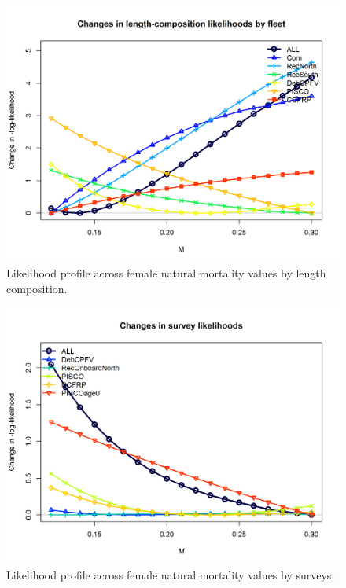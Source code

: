 \documentclass[12pt,]{article}
\begin{document}
\begin{figure}
\centering
\includegraphics{Figures/profile_m_piner.png}
\caption{Likelihood profile across female natural mortality values by
length composition. \label{fig:profile_m_piner}}
\end{figure}

\FloatBarrier 

\begin{figure}
\centering
\includegraphics{Figures/profile_m_piner2.png}
\caption{Likelihood profile across female natural mortality values by
surveys. \label{fig:profile_m_piner2}}
\end{figure}
\end{document}
